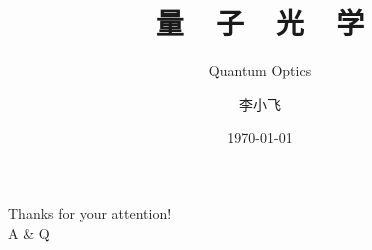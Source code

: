 \documentclass[12pt,UTF8,aspectratio=169]{beamer}
\begin{document}

\author{李小飞}
\title{\textbf{\Huge 量~~子~~光~~学}}
\subtitle{Quantum Optics}
\date{\today}

\begin{frame} [plain]
     {} %
    \Background[17] 
    \maketitle
    \addtocounter{framenumber}{-1} 
\end{frame}

%



\begin{frame}[plain]
    \Background[2] 
	\begin{center}
		{\huge \color{deepred} \textrm{Thanks for your attention!  \\ \vspace{1.0em}
         A \& Q}}
	\end{center}
    \addtocounter{framenumber}{-1} 
\end{frame}

\end{document}
